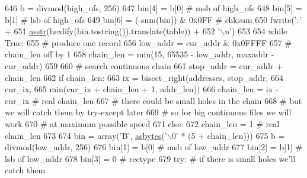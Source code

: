 \begin{DoxyCode}
646                     b = divmod(high\_ofs, 256)
647                     bin[4] = b[0]  \textcolor{comment}{# msb of high\_ofs}
648                     bin[5] = b[1]  \textcolor{comment}{# lsb of high\_ofs}
649                     bin[6] = (-sum(bin)) & 0x0FF  \textcolor{comment}{# chksum}
650                     fwrite(\textcolor{stringliteral}{':'} +
651                            \hyperlink{namespacesoftware_1_1chipwhisperer_1_1capture_1_1utils_1_1IntelHex_a32eb6deeafe6dba1f76d94543cff7528}{asstr}(hexlify(bin.tostring()).translate(table)) +
652                            \textcolor{stringliteral}{'\(\backslash\)n'})
653 
654                 \textcolor{keywordflow}{while} \textcolor{keyword}{True}:
655                     \textcolor{comment}{# produce one record}
656                     low\_addr = cur\_addr & 0x0FFFF
657                     \textcolor{comment}{# chain\_len off by 1}
658                     chain\_len = min(15, 65535 - low\_addr, maxaddr - cur\_addr)
659 
660                     \textcolor{comment}{# search continuous chain}
661                     stop\_addr = cur\_addr + chain\_len
662                     \textcolor{keywordflow}{if} chain\_len:
663                         ix = bisect\_right(addresses, stop\_addr,
664                                           cur\_ix,
665                                           min(cur\_ix + chain\_len + 1, addr\_len))
666                         chain\_len = ix - cur\_ix  \textcolor{comment}{# real chain\_len}
667                         \textcolor{comment}{# there could be small holes in the chain}
668                         \textcolor{comment}{# but we will catch them by try-except later}
669                         \textcolor{comment}{# so for big continuous files we will work}
670                         \textcolor{comment}{# at maximum possible speed}
671                     \textcolor{keywordflow}{else}:
672                         chain\_len = 1  \textcolor{comment}{# real chain\_len}
673 
674                     bin = array(\textcolor{stringliteral}{'B'}, \hyperlink{namespacesoftware_1_1chipwhisperer_1_1capture_1_1utils_1_1IntelHex_a7f086f0677c4876409244a91e386b8cc}{asbytes}(\textcolor{stringliteral}{'\(\backslash\)0'} * (5 + chain\_len)))
675                     b = divmod(low\_addr, 256)
676                     bin[1] = b[0]  \textcolor{comment}{# msb of low\_addr}
677                     bin[2] = b[1]  \textcolor{comment}{# lsb of low\_addr}
678                     bin[3] = 0  \textcolor{comment}{# rectype}
679                     \textcolor{keywordflow}{try}:  \textcolor{comment}{# if there is small holes we'll catch them}

\end{DoxyCode}
